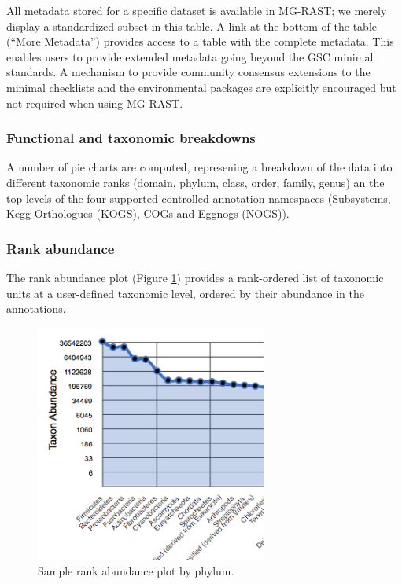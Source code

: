 \documentclass[12pt,fullpage]{report}
\begin{document}
All metadata stored for a specific dataset is available in MG-RAST; we merely display a standardized subset in this table. A link at the bottom of the table (``More Metadata'') provides access to a table with the complete metadata. This enables users to provide extended metadata going beyond the GSC minimal standards. A mechanism to provide community consensus extensions to the minimal checklists and the environmental packages are explicitly encouraged but not required when using MG-RAST.
\subsubsection*{Functional and taxonomic breakdowns}

A number of pie charts are computed, represening a breakdown of the data into different taxonomic ranks
(domain, phylum, class, order, family, genus) an the top levels of the four supported controlled annotation namespaces (Subsystems, Kegg Orthologues (KOGS), COGs and Eggnogs (NOGS)).




\subsubsection*{Rank abundance}

The rank abundance plot (Figure \ref{fig:rank-abundance}) provides a rank-ordered list of taxonomic units at a user-defined taxonomic level, ordered by their abundance in the annotations.

\begin{figure}
\begin{center}
\includegraphics[width=3in]{Images/rank-abundance.png}
\end{center}
\caption{
Sample rank abundance plot by phylum.
}
\label{fig:rank-abundance}
\end{figure}
\end{document}
